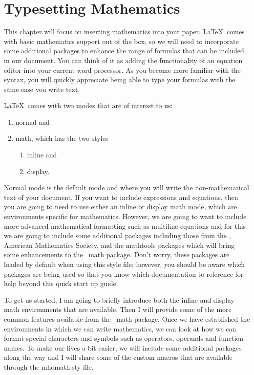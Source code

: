\chapter{Typesetting Mathematics}

This chapter will focus on inserting mathematics into your paper. \LaTeX ~comes 
with basic mathematics support out of the box, so we will need to 
incorporate some additional packages to enhance the range of formulas that can 
be included in our document.  You can think of it as adding the functionality 
of an equation editor into your current word processor. As you become more 
familiar with the syntax, you will quickly appreciate being able to type
your formulas with the same ease you write text.

\LaTeX ~comes with two modes that are of interest to us: 
\begin{enumerate}
  \item normal and
  \item math, which has the two styles
  \begin{enumerate}
    \item inline and
    \item display.
  \end{enumerate}
\end{enumerate}
Normal mode is the default mode and where you will write the non-mathematical text
of your document.  If you want to include expressions and equations,
then you are going to need to use either an inline or display math mode, 
which are environments specific for mathematics.  However, we are going to
want to include more advanced mathematical formatting such as multiline 
equations and for this we are going to include some additional packages
including those from the \AmS, American Mathematics Society, and the mathtools\cite{CTANmathtools}
packages which will bring some enhancements to the \AmS ~math package\cite{CTANamsmath}.  Don't worry,
these packages are loaded by default when using this style file; however, 
you should be aware which packages are being used so that you know which 
documentation to reference for help beyond this quick start up guide.

To get us started, I am going to briefly introduce both the inline and 
display math environments that are available.  Then I will provide some of the 
more common features available from the \AmS ~math package.  Once we have 
established the environments in which we can write mathematics, we can look
at how we can format special characters  and symbols such as operators, 
operands and function names.  To make our lives a bit easier, we will include
some additional packages along the way and I will share some of the custom
macros that are available through the mhomath.sty file.


